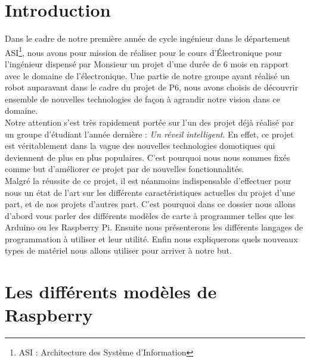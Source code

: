 \section*{Introduction} %
\label{sec:introduction}

Dans le cadre de notre première année de cycle ingénieur dans le département ASI\footnote{ASI : Architecture des Système d'Information}, nous avons pour mission de réaliser pour le cours d'Électronique pour l'ingénieur dispensé par Monsieur  un projet d'une durée de 6 mois en rapport avec le domaine de l'électronique. Une partie de notre groupe ayant réalisé un robot auparavant dans le cadre du projet de P6, nous avons choisis de découvrir ensemble de nouvelles technologies de façon à agrandir notre vision dans ce domaine.\\

Notre attention s'est très rapidement portée sur l'un des projet déjà réalisé par un groupe d'étudiant l'année dernière : \emph{Un réveil intelligent}. En effet, ce projet est véritablement dans la vague des nouvelles technologies domotiques qui deviennent de plus en plus populaires. C'est pourquoi nous nous sommes fixés comme but d'améliorer ce projet par de nouvelles fonctionnalités. \\

Malgré la réussite de ce projet, il est néanmoins indispensable d'effectuer pour nous un état de l'art sur les différents caractéristiques actuelles du projet d'une part, et de nos projets d'autres part. C'est pourquoi dans ce dossier nous allons d'abord vous parler des différents modèles de carte à programmer telles que les Arduino ou les Raspberry Pi. Ensuite nous présenterons les différents langages de programmation à utiliser et leur utilité. Enfin nous expliquerons quels nouveaux types de matériel nous allons utiliser pour arriver à notre but.\\

\section{Les différents modèles de Raspberry} %
\label{sec:les_diff_rents_mod_les_de_raspberry}

